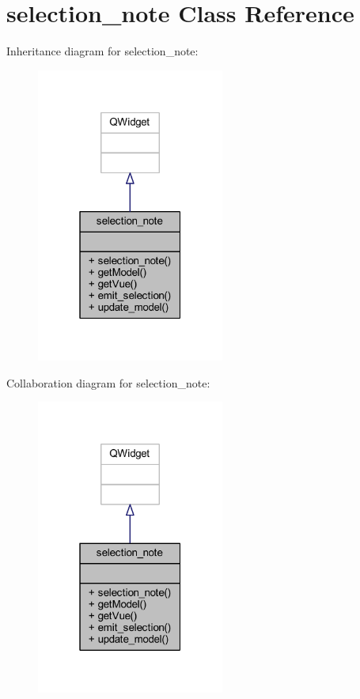 \hypertarget{classselection__note}{}\section{selection\+\_\+note Class Reference}
\label{classselection__note}


Inheritance diagram for selection\+\_\+note\+:\nopagebreak
\begin{figure}[H]
\begin{center}
\leavevmode
\includegraphics[width=175pt]{classselection__note__inherit__graph}
\end{center}
\end{figure}


Collaboration diagram for selection\+\_\+note\+:\nopagebreak
\begin{figure}[H]
\begin{center}
\leavevmode
\includegraphics[width=175pt]{classselection__note__coll__graph}
\end{center}
\end{figure}
